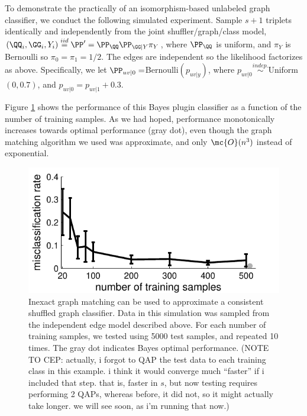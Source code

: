 \documentclass[10pt,journal,cspaper,compsoc]{IEEEtran}
\begin{document}
To demonstrate the practically of an isomorphism-based unlabeled graph classifier, we conduct the following simulated experiment. Sample $s+1$ triplets identically and independently from the joint shuffler/graph/class model, $(\QQ_i,\GG_i,Y_i)\overset{iid}{=}\PP'=\PP_{\QQ}\PP_{\GG|Y} \pi_Y$, where $\PP_{\QQ}$ is uniform, and $\pi_Y$ is Bernoulli so $\pi_0=\pi_1=1/2$.  The edges are independent so the likelihood factorizes as above.  Specifically, we let $\PP_{uv|0}=$Bernoulli$(p_{uv|y})$, where $p_{uv|0} \overset{indep.}{\sim}$Uniform$(0,0.7)$, and $p_{uv|0}=p_{uv|1}+0.3$.  


Figure \ref{fig:1} shows the performance of this Bayes plugin classifier as a function of the number of training samples.  As we had hoped, performance monotonically increases towards optimal performance (gray dot), even though the graph matching algorithm we used was approximate, and only $\mc{O}(n^3)$ instead of exponential.

\begin{figure}[htbp]
	\centering
		\includegraphics[width=1.0\linewidth]{../figs/hetero_easy_n10_MC5000_QAP_vs_n.pdf}
	\caption{Inexact graph matching can be used to approximate a consistent shuffled graph classifier.  Data in this simulation was sampled from the independent edge model described above.  For each number of training samples, we tested using 5000 test samples, and repeated 10 times.  The gray dot indicates Bayes optimal performance. (NOTE TO CEP: actually, i forgot to QAP the test data to each training class in this example.  i think it would converge much ``faster'' if i included that step. that is, faster in $s$, but now testing requires performing 2 QAPs, whereas before, it did not, so it might actually take longer.  we will see soon, as i'm running that now.)}
	\label{fig:1}
\end{figure}


\end{document}
